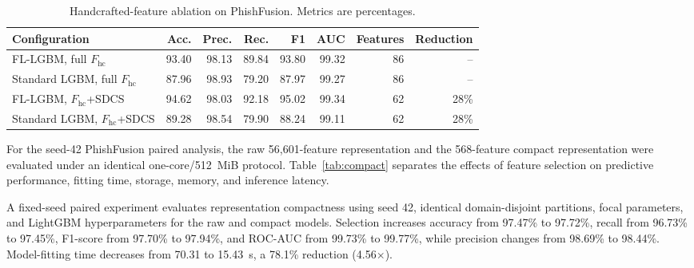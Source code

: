 \documentclass[10pt]{article}
\begin{document}
\begin{table}[ht]
\centering
\caption{Handcrafted-feature ablation on PhishFusion. Metrics are percentages.}
\begin{tabular}{lrrrrrrr}
\toprule
Configuration & Acc. & Prec. & Rec. & F1 & AUC & Features & Reduction \\
\midrule
FL-LGBM, full $F_{\mathrm{hc}}$ & 93.40 & 98.13 & 89.84 & 93.80 & 99.32 & 86 & -- \\
Standard LGBM, full $F_{\mathrm{hc}}$ & 87.96 & 98.93 & 79.20 & 87.97 & 99.27 & 86 & -- \\
FL-LGBM, $F_{\mathrm{hc}}$+SDCS & 94.62 & 98.03 & 92.18 & 95.02 & 99.34 & 62 & 28\% \\
Standard LGBM, $F_{\mathrm{hc}}$+SDCS & 89.28 & 98.54 & 79.90 & 88.24 & 99.11 & 62 & 28\% \\
\bottomrule
\end{tabular}
\end{table}

For the seed-42 PhishFusion paired analysis, the raw 56,601-feature representation and the 568-feature compact representation were evaluated under an identical one-core/512~MiB protocol. Table~\ref{tab:compact} separates the effects of feature selection on predictive performance, fitting time, storage, memory, and inference latency.

{\color{supportingtext}
A fixed-seed paired experiment evaluates representation compactness using seed 42, identical domain-disjoint partitions, focal parameters, and LightGBM hyperparameters for the raw and compact models. Selection increases accuracy from 97.47\% to 97.72\%, recall from 96.73\% to 97.45\%, F1-score from 97.70\% to 97.94\%, and ROC-AUC from 99.73\% to 99.77\%, while precision changes from 98.69\% to 98.44\%. Model-fitting time decreases from 70.31 to 15.43~s, a 78.1\% reduction (4.56$\times$).
}
\end{document}
